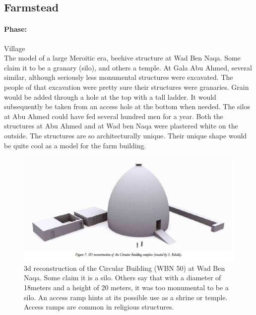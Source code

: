 \documentclass[a4paper,12pt]{scrreprt}
\begin{document}
\subsection{Farmstead}

\paragraph{Phase:} Village\\

The model of a large Meroitic era, beehive structure at Wad Ben Naqa. Some claim it to be a granary (silo), and others a temple. At Gala Abu Ahmed, several similar, although seriously less monumental structures were excavated. The people of that excavation were pretty sure their structures were granaries. Grain would be added through a hole at the top with a tall ladder. It would subsequently be taken from an access hole at the bottom when needed. The silos at Abu Ahmed could have fed several hundred men for a year. Both the structures at Abu Ahmed and at Wad ben Naqa were plastered white on the outside. The structures are so architecturally unique. Their unique shape would be quite cool as a model for the farm building.

\begin{figure}[H]
	\centering
	\includegraphics[width=\textwidth]{img/farmstead/3d_reconstruction}
	\caption{3d reconstruction of the Circular Building (WBN 50) at Wad Ben Naqa. Some claim it is a silo. Others say that with a diameter of 18meters and a height of 20 meters, it was too monumental to be a silo. An access ramp hints at its possible use as a shrine or temple. Access ramps are common in religious structures. }
\end{figure}
\end{document}
